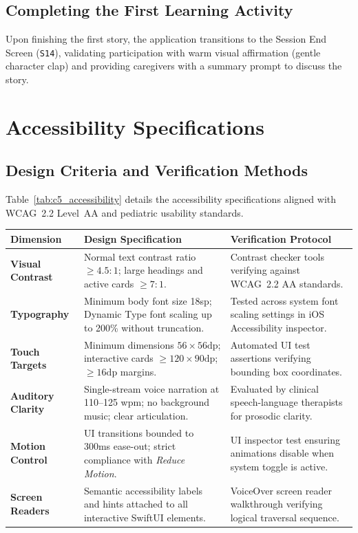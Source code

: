 \subsection{Completing the First Learning Activity}

Upon finishing the first story, the application transitions to the Session End Screen (\texttt{S14}), validating participation with warm visual affirmation (gentle character clap) and providing caregivers with a summary prompt to discuss the story.

\section{Accessibility Specifications}

\subsection{Design Criteria and Verification Methods}

Table~\ref{tab:c5_accessibility} details the accessibility specifications aligned with WCAG~2.2 Level~AA and pediatric usability standards.

\begin{xltabular}{\textwidth}{|p{3.0cm}|p{4.5cm}|X|}
\hline
\textbf{Dimension} & \textbf{Design Specification} & \textbf{Verification Protocol} \\ \hline
\endhead
\textbf{Visual Contrast} & Normal text contrast ratio $\ge 4.5:1$; large headings and active cards $\ge 7:1$. & Contrast checker tools verifying against WCAG~2.2 AA standards. \\ \hline
\textbf{Typography} & Minimum body font size 18sp; Dynamic Type font scaling up to 200\% without truncation. & Tested across system font scaling settings in iOS Accessibility inspector. \\ \hline
\textbf{Touch Targets} & Minimum dimensions $56\times 56\text{dp}$; interactive cards $\ge 120\times 90\text{dp}$; $\ge 16\text{dp}$ margins. & Automated UI test assertions verifying bounding box coordinates. \\ \hline
\textbf{Auditory Clarity} & Single-stream voice narration at 110--125 wpm; no background music; clear articulation. & Evaluated by clinical speech-language therapists for prosodic clarity. \\ \hline
\textbf{Motion Control} & UI transitions bounded to 300ms ease-out; strict compliance with \textit{Reduce Motion}. & UI inspector test ensuring animations disable when system toggle is active. \\ \hline
\textbf{Screen Readers} & Semantic accessibility labels and hints attached to all interactive SwiftUI elements. & VoiceOver screen reader walkthrough verifying logical traversal sequence. \\ \hline
\end{xltabular}
\label{tab:c5_accessibility}

